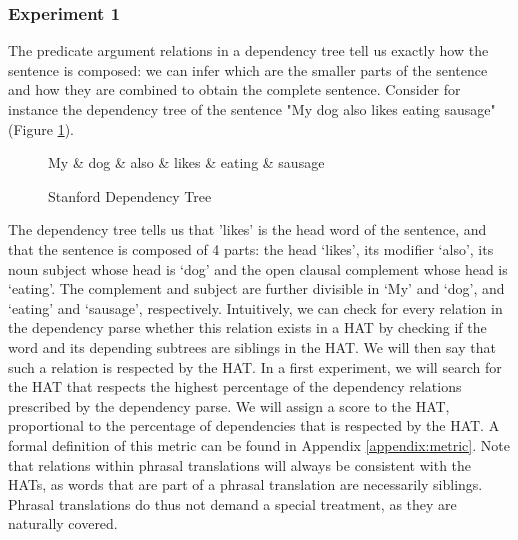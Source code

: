 \documentclass{report}
\theoremstyle{definition}
\theoremstyle{plain}
\begin{document}
\subsubsection{Experiment 1}

The predicate argument relations in a dependency tree tell us exactly how the sentence is composed: we can infer which are the smaller parts of the sentence and how they are combined to obtain the complete sentence. Consider for instance the dependency tree of the sentence "My dog also likes eating sausage" (Figure \ref{fig:deptree1}).

\begin{figure}[!h]\label{fig:deptree1}
\centering
\begin{dependency}[theme=simple]%
\begin{deptext}[column sep=.5cm, row sep=.1ex]
My \& dog \& also \& likes \& eating \& sausage \\
\end{deptext}
\end{dependency}
\caption{Stanford Dependency Tree}
\end{figure}

The dependency tree tells us that 'likes' is the head word of the sentence, and that the sentence is composed of 4 parts: the head `likes', its modifier `also', its noun subject whose head is `dog' and the open clausal complement whose head is `eating'. The complement and subject are further divisible in `My' and `dog', and `eating' and `sausage', respectively. Intuitively, we can check for every relation in the dependency parse whether this relation exists in a HAT by checking if the word and its depending subtrees are siblings in the HAT. We will then say that such a relation is respected by the HAT. In a first experiment, we will search for the HAT that respects the highest percentage of the dependency relations prescribed by the dependency parse. We will assign a score to the HAT, proportional to the percentage of dependencies that is respected by the HAT. A formal definition of this metric can be found in Appendix \ref{appendix:metric}. Note that relations within phrasal translations will always be consistent with the HATs, as words that are part of a phrasal translation are necessarily siblings. Phrasal translations do thus not demand a special treatment, as they are naturally covered.
\end{document}
